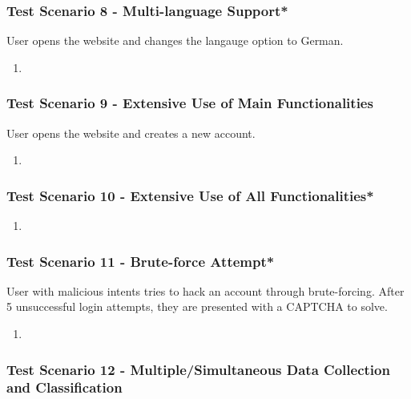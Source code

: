 \subsubsection{Test Scenario 8 - Multi-language Support*}
User opens the website and changes the langauge option to German. 
\begin{enumerate}
    \item 
\end{enumerate}
\subsubsection{Test Scenario 9 - Extensive Use of Main Functionalities}
User opens the website and creates a new account. 
\begin{enumerate}
    \item 
\end{enumerate}
\subsubsection{Test Scenario 10 - Extensive Use of All Functionalities*}

\begin{enumerate}
    \item 
\end{enumerate}
\subsubsection{Test Scenario 11 - Brute-force Attempt*}
User with malicious intents tries to hack an account through brute-forcing. After 5 unsuccessful login attempts, they are presented with a CAPTCHA to solve.
\begin{enumerate}
    \item 
\end{enumerate}
\subsubsection{Test Scenario 12 - Multiple/Simultaneous Data Collection and Classification}
